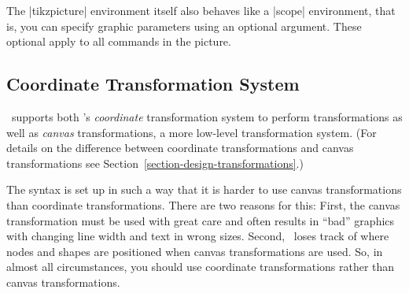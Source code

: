 \begin{codeexample}[]
\begin{tikzpicture}
  \begin{scope}[color=red]
    \draw (0mm,10mm) -- (10mm,10mm);
    \draw (0mm, 8mm) -- (10mm, 8mm);
    \draw (0mm, 6mm) -- (10mm, 6mm);
  \end{scope}
  \begin{scope}[color=green]
    \draw             (0mm, 4mm) -- (10mm, 4mm);
    \draw             (0mm, 2mm) -- (10mm, 2mm);
    \draw[color=blue] (0mm, 0mm) -- (10mm, 0mm);
  \end{scope}
\end{tikzpicture}
\end{codeexample}

The |{tikzpicture}| environment itself also behaves like a
|{scope}| environment, that is, you can specify graphic parameters
using an optional argument. These optional apply to all commands in
the picture.


\subsection{Coordinate Transformation System}

\tikzname\ supports both \pgfname's \emph{coordinate} transformation
system to perform transformations as well as \emph{canvas}
transformations, a more low-level transformation system. (For
details on the difference between coordinate transformations and
canvas transformations see Section~\ref{section-design-transformations}.)

The syntax is set up in such a way that it is harder to use canvas
transformations than coordinate transformations. There are two reasons
for this: First, the canvas transformation must be used with great
care and often results in ``bad'' graphics with changing line width
and text in wrong sizes. Second, \pgfname\ loses track of where nodes
and shapes are positioned when canvas transformations are used.
So, in almost all circumstances, you should use coordinate
transformations rather than canvas transformations.
